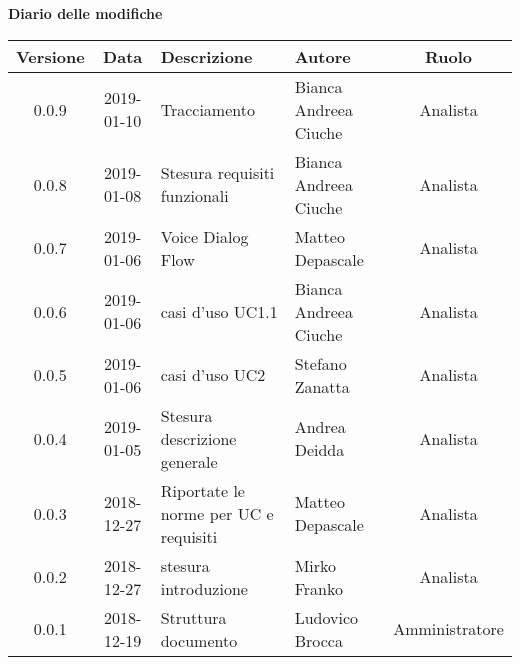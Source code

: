 	\begin{center}
		\textbf{Diario delle modifiche}
	\end{center}
	\begin{center}
		\begin{tabularx}{\textwidth}{|c|c|X|X|c|}
			\hline
			\textbf{Versione} & \textbf{Data} & \textbf{Descrizione} & \textbf{Autore} & \textbf{Ruolo} \\
			\hline
			0.0.9 & 2019-01-10 &Tracciamento& Bianca Andreea Ciuche& Analista\\
			\hline
			0.0.8 & 2019-01-08 &Stesura requisiti funzionali& Bianca Andreea Ciuche& Analista\\
			\hline
			0.0.7 & 2019-01-06 & Voice Dialog Flow & Matteo Depascale & Analista\\
			\hline
			0.0.6 & 2019-01-06 & casi d'uso UC1.1& Bianca Andreea Ciuche & Analista\\
			\hline
			0.0.5 & 2019-01-06 & casi d'uso UC2& Stefano Zanatta & Analista\\
			\hline
			0.0.4 & 2019-01-05 & Stesura descrizione generale& Andrea Deidda & Analista\\
			\hline
			0.0.3 & 2018-12-27 & Riportate le norme per UC e requisiti& Matteo Depascale & Analista\\
			\hline
			0.0.2 & 2018-12-27 & stesura introduzione & Mirko Franko & Analista\\
			\hline
			0.0.1 & 2018-12-19 & Struttura documento & Ludovico Brocca & Amministratore\\
			\hline
		\end{tabularx}
	\end{center}
\newpage